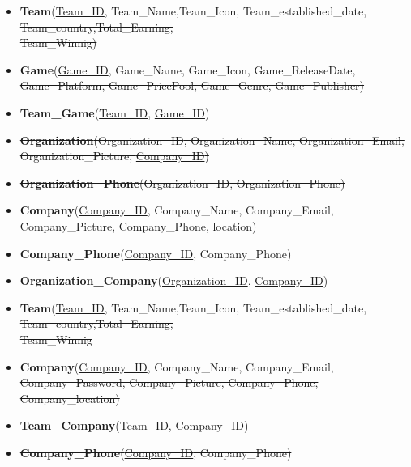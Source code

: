 \begin{itemize}
    \item \sout{\textbf{Team}(\underline{Team\_ID}, Team\_Name,Team\_Icon, Team\_established\_date, Team\_country,Total\_Earning,\\Team\_Winnig)}
    \item \sout {\textbf{Game}(\underline{Game\_ID}, Game\_Name, Game\_Icon, Game\_ReleaseDate, Game\_Platform, Game\_PricePool, Game\_Genre, Game\_Publisher)}
    \item \textbf{Team\_Game}(\underline{Team\_ID}, \underline{Game\_ID})


    \item \sout{\textbf{Organization}(\underline{Organization\_ID}, Organization\_Name, Organization\_Email, Organization\_Picture, \underline{Company\_ID})}
    \item \sout{\textbf{Organization\_Phone}(\underline{Organization\_ID}, Organization\_Phone)}
    \item \textbf{Company}(\underline{Company\_ID}, Company\_Name, Company\_Email, Company\_Picture, Company\_Phone, location)
    \item \textbf{Company\_Phone}(\underline{Company\_ID}, Company\_Phone)
    \item \textbf{Organization\_Company}(\underline{Organization\_ID}, \underline{Company\_ID})


    \item \sout{\textbf{Team}(\underline{Team\_ID}, Team\_Name,Team\_Icon, Team\_established\_date, Team\_country,Total\_Earning,\\Team\_Winnig}
    \item \sout{\textbf{Company}(\underline{Company\_ID}, Company\_Name, Company\_Email, Company\_Password, Company\_Picture, Company\_Phone, Company\_location)}
    \item \textbf{Team\_Company}(\underline{Team\_ID}, \underline{Company\_ID})
    \item \sout{\textbf{Company\_Phone}(\underline{Company\_ID}, Company\_Phone)}
\end{itemize}